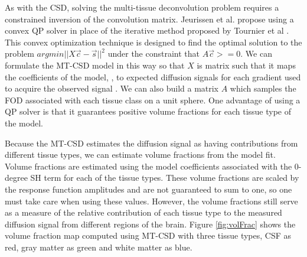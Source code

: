 As with the CSD, solving the multi-tissue deconvolution problem requires a constrained inversion of the convolution matrix. Jeurissen et al. propose using a convex QP solver in place of the iterative method proposed by Tournier et al \cite{Mehrotra_1992}. This convex optimization technique is designed to find the optimal solution to the problem $argmin||X\vec{c} - \vec{s}||^2$ under the constraint that $A\vec{c} >= 0$. We can formulate the MT-CSD model in this way so that $X$ is matrix such that it maps the coefficients of the model, , to expected diffusion signals for each gradient used to acquire the observed signal . We can also build a matrix $A$ which samples the FOD associated with each tissue class on a unit sphere. One advantage of using a QP solver is that it guarantees positive volume fractions for each tissue type of the model.

Because the MT-CSD estimates the diffusion signal as having contributions from different tissue types, we can estimate volume fractions from the model fit. Volume fractions are estimated using the model coefficients associated with the 0-degree SH term for each of the tissue types. These volume fractions are scaled by the response function amplitudes and are not guaranteed to sum to one, so one must take care when using these values. However, the volume fractions still serve as a measure of the relative contribution of each tissue type to the measured diffusion signal from different regions of the brain. Figure \ref{fig:volFrac} shows the volume fraction map computed using MT-CSD with three tissue types, CSF as red, gray matter as green and white matter as blue.